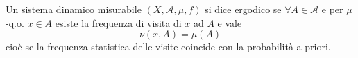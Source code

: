\begin{definition}
    Un sistema dinamico misurabile $ (X, \mathcal{A}, \mu, f) $ si dice ergodico se $ \forall A \in \mathcal{A} $ e per $ \mu $-q.o. $ x \in A $ esiste la frequenza di visita di $ x $ ad $ A $ e vale
    \[
        \nu(x, A) = \mu(A)
    \]
    cioè se la frequenza statistica delle visite coincide con la probabilità a priori. 
\end{definition}

